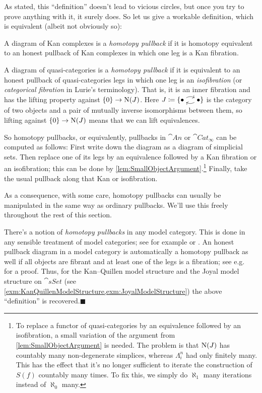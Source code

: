 \begin{numpar}
	As stated, this \enquote{definition} doesn't lead to vicious circles, but once you try to prove anything with it, it surely does. So let us give a workable definition, which is equivalent (albeit not obviously so):
	\begin{alphanumerate}
		\item A diagram of Kan complexes is a \emph{homotopy pullback} if it is homotopy equivalent to an honest pullback of Kan complexes in which one leg is a Kan fibration.\label{enum:HomotopyPullbackOfKanComplexes}
		\item A diagram of quasi-categories is a \emph{homotopy pullback} if it is equivalent to an honest pullback of quasi-categories legs in which one leg is an \emph{isofibration} (or \emph{categorical fibration} in Lurie's terminology). That is, it is an inner fibration and has the lifting property against $\{0\}\rightarrow \operatorname{N}(J)$. Here $J\coloneqq \{\InlineJ\}$ is the category of two objects and a pair of mutually inverse isomorphisms between them, so lifting against $\{0\}\rightarrow \operatorname{N}(J)$ means that we can lift equivalences.\label{enum:HomotopyPullbackOfQuasicategories}
	\end{alphanumerate}
	So homotopy pullbacks, or equivalently, pullbacks in $\cat{An}$ or $\cat{Cat}_\infty$ can be computed as follows: First write down the diagram as a diagram of simplicial sets. Then replace one of its legs by an equivalence followed by a Kan fibration or an isofibration; this can be done by \cref{lem:SmallObjectArgument}.\footnote{To replace a functor of quasi-categories by an equivalence followed by an isofibration, a small variation of the argument from \cref{lem:SmallObjectArgument} is needed. The problem is that $\operatorname{N}(J)$ has countably many non-degenerate simplices, whereas $\Lambda_i^n$ had only finitely many. This has the effect that it's no longer sufficient to iterate the construction of $S(f)$ countably many times. To fix this, we simply do $\aleph_1$ many iterations instead of $\aleph_0$ many.} Finally, take the usual pullback along that Kan or isofibration.
\end{numpar}
As a consequence, with some care, homotopy pullbacks can usually be manipulated in the same way as ordinary pullbacks. We'll use this freely throughout the rest of this section.
\begin{numpar}\label{par:HomotopyPullback}
	There's a notion of \emph{homotopy pullbacks} in any model category. This is done in any sensible treatment of model categories; see for example \cite[Definition~{\href{https://cisinski.app.uni-regensburg.de/CatLR.pdf\#thm.2.3.22}{2.3.22}}]{Cisinski} or \cite[Definition~VIII.49(vi)]{HigherCatsII}. An honest pullback diagram in a model category is automatically a homotopy pullback as well if all objects are fibrant and at least one of the legs is a fibration; see e.g.\  \cite[Proposition~{\href{https://cisinski.app.uni-regensburg.de/CatLR.pdf\#thm.2.3.27}{2.3.27}}]{Cisinski} for a proof. Thus, for the Kan--Quillen model structure and the Joyal model structure on $\cat{sSet}$ (see \cref{exm:KanQuillenModelStructure,exm:JoyalModelStructure}) the above \enquote{definition} is recovered.\hfill$\blacksquare$
\end{numpar}
